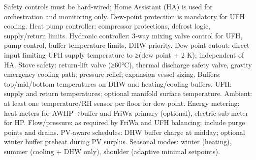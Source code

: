 \markdownRendererDocumentBegin
\markdownRendererSectionBegin
{}\markdownRendererInterblockSeparator
{}Safety controls must be hard‑wired; Home Assistant (HA) is used for orchestration and monitoring only. Dew‑point protection is mandatory for UFH cooling.\markdownRendererInterblockSeparator
{}\markdownRendererSectionBegin
{}\markdownRendererInterblockSeparator
{}\markdownRendererUlBeginTight
\markdownRendererUlItem Heat pump controller: compressor protections, defrost logic, supply/return limits.\markdownRendererUlItemEnd 
\markdownRendererUlItem Hydronic controller: 3‑way mixing valve control for UFH, pump control, buffer temperature limits, DHW priority.\markdownRendererUlItemEnd 
\markdownRendererUlItem Dew‑point cutout: direct input limiting UFH supply temperature to ≥(dew point + 2 K); independent of HA.\markdownRendererUlItemEnd 
\markdownRendererUlItem Stove safety: return‑lift valve (≥60°C), thermal discharge safety valve, gravity emergency cooling path; pressure relief; expansion vessel sizing.\markdownRendererUlItemEnd 
\markdownRendererUlEndTight \markdownRendererInterblockSeparator
{}
\markdownRendererSectionEnd \markdownRendererSectionBegin
{}\markdownRendererInterblockSeparator
{}\markdownRendererUlBeginTight
\markdownRendererUlItem Buffers: top/mid/bottom temperatures on DHW and heating/cooling buffers.\markdownRendererUlItemEnd 
\markdownRendererUlItem UFH: supply and return temperatures; optional manifold surface temperature.\markdownRendererUlItemEnd 
\markdownRendererUlItem Ambient: at least one temperature/RH sensor per floor for dew point.\markdownRendererUlItemEnd 
\markdownRendererUlItem Energy metering: heat meters for AWHP→buffer and FriWa primary (optional), electric sub‑meter for HP.\markdownRendererUlItemEnd 
\markdownRendererUlItem Flow/pressure: as required by FriWa and UFH balancing; include purge points and drains.\markdownRendererUlItemEnd 
\markdownRendererUlEndTight \markdownRendererInterblockSeparator
{}
\markdownRendererSectionEnd \markdownRendererSectionBegin
{}\markdownRendererInterblockSeparator
{}\markdownRendererUlBeginTight
\markdownRendererUlItem PV‑aware schedules: DHW buffer charge at midday; optional winter buffer preheat during PV surplus.\markdownRendererUlItemEnd 
\markdownRendererUlItem Seasonal modes: winter (heating), summer (cooling + DHW only), shoulder (adaptive minimal setpoints).\markdownRendererUlItemEnd 
